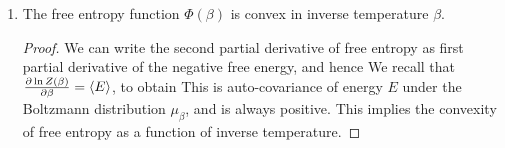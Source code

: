\documentclass[letterpaper,english,10pt]{article}
\begin{document}
\begin{lem}
\begin{enumerate}
\begin{proof}
Therefore, we recognize that
$S(\beta)%
=-\sum_{x \in \sX} \mu_\beta \ln \mu_\beta(x) = H(\mu_\beta)\ln 2$.
\end{proof}
\item The free entropy function $\Phi(\beta)$ is convex in inverse temperature $\beta$. 
\begin{proof} 
We can write the second partial derivative of free entropy as first partial derivative of the negative free energy, 
and hence 
We recall that $\frac{\partial \ln Z(\beta)}{\partial \beta} = \left\langle E\right\rangle$, to obtain
This is auto-covariance of energy $E$ under the Boltzmann distribution $\mu_{\beta}$, and is always positive. 
This implies the convexity of free entropy as a function of inverse temperature. 
\end{proof}
\end{enumerate}
\end{lem}
\end{document}

